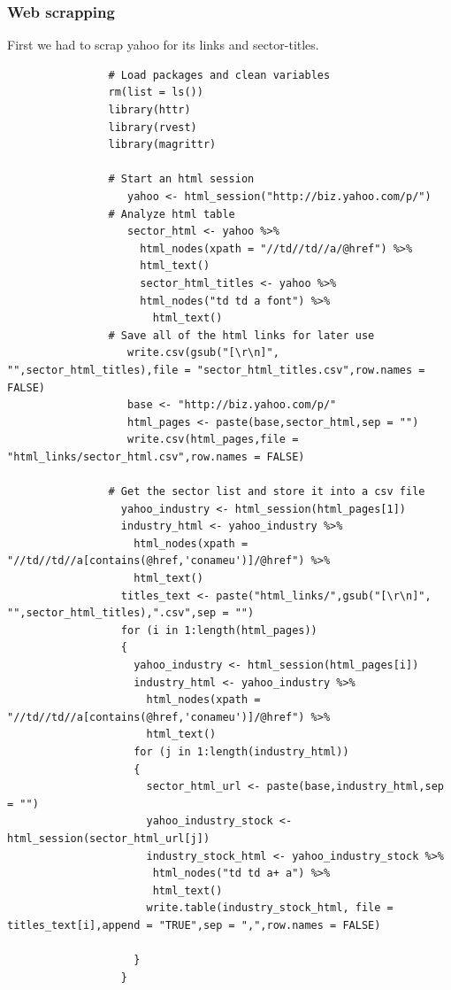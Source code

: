 \documentclass[12pt,titlepage,letter]{article}
\begin{document}
		\subsubsection{Web scrapping}\label{web scrapping}
			First we had to scrap yahoo for its links and sector-titles.
			\begin{lstlisting}
				# Load packages and clean variables
				rm(list = ls())
				library(httr)
				library(rvest)
				library(magrittr)

				# Start an html session
				   yahoo <- html_session("http://biz.yahoo.com/p/")
				# Analyze html table
				   sector_html <- yahoo %>%
					 html_nodes(xpath = "//td//td//a/@href") %>%
					 html_text()
					 sector_html_titles <- yahoo %>%
					 html_nodes("td td a font") %>%
					   html_text()
				# Save all of the html links for later use   
				   write.csv(gsub("[\r\n]", "",sector_html_titles),file = "sector_html_titles.csv",row.names = FALSE)
				   base <- "http://biz.yahoo.com/p/"
				   html_pages <- paste(base,sector_html,sep = "")
				   write.csv(html_pages,file = "html_links/sector_html.csv",row.names = FALSE)

				# Get the sector list and store it into a csv file   
				  yahoo_industry <- html_session(html_pages[1])
				  industry_html <- yahoo_industry %>%
				    html_nodes(xpath = "//td//td//a[contains(@href,'conameu')]/@href") %>%
				    html_text()
				  titles_text <- paste("html_links/",gsub("[\r\n]", "",sector_html_titles),".csv",sep = "")
				  for (i in 1:length(html_pages))
				  {
				    yahoo_industry <- html_session(html_pages[i])
				    industry_html <- yahoo_industry %>%
				      html_nodes(xpath = "//td//td//a[contains(@href,'conameu')]/@href") %>%
				      html_text()
				    for (j in 1:length(industry_html))
				    {
				      sector_html_url <- paste(base,industry_html,sep = "")
				      yahoo_industry_stock <- html_session(sector_html_url[j])
				      industry_stock_html <- yahoo_industry_stock %>%
				       html_nodes("td td a+ a") %>%
				       html_text()
				      write.table(industry_stock_html, file = titles_text[i],append = "TRUE",sep = ",",row.names = FALSE)
				    
				    }
				  }
			\end{lstlisting}
\end{document}
